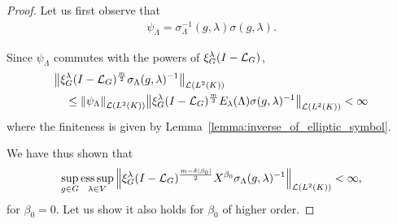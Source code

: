 \begin{proof}
    Let us first observe that
    \begin{align}
        \psi_\Lambda = \sigma^{-1}_\Lambda(g, \lambda) \sigma(g, \lambda).
        \label{eq:identity_satisfied_by_inverse_of_symbol}
    \end{align}

    Since $\psi_\Lambda$ commutes with the powers of $\Rep \lambda \BesselPotentialSquared {}$,
    \begin{align*}
        &\norm [\Lin {\Lebesgue 2 \CompactGroup}] {\Rep \lambda \BesselPotential m \sigma_\Lambda(g, \lambda)^{-1}}\\
        &\quad \leq
        \norm [\Lin {\Lebesgue 2 \CompactGroup}] {\psi_\Lambda}
        \norm [\Lin {\Lebesgue 2 \CompactGroup}] {\Rep \lambda \BesselPotential m E_\lambda(\Lambda) \sigma(g, \lambda)^{-1}}
        < \infty
    \end{align*}
    where the finiteness is given by Lemma~\ref{lemma:inverse_of_elliptic_symbol}.

    We have thus shown that
    \begin{align*}
        \sup_{g \in \Group}
        \esssup_{\lambda \in \VectorSpace}
        \norm [\Lin {\Lebesgue 2 \CompactGroup}] {\Rep \lambda \BesselPotential {m - \delta \abs {\beta_0}} \LeftDifferentialOperator {\beta_0} \sigma_\Lambda(g, \lambda)^{-1}}
        < \infty,
    \end{align*}
    for $\beta_0 = 0$.
    Let us show it also holds for $\beta_0$ of higher order.


\end{proof}
